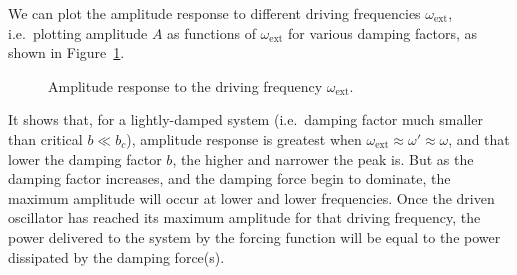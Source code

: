 We can plot the amplitude response to different driving frequencies
$\omega_\text{ext}$, i.e.\ plotting amplitude $A$ as functions of
$\omega_\text{ext}$ for various damping factors, as shown in
Figure~\ref{fig:amp-response}.
\begin{figure}[ht]
  \centering
  \caption{Amplitude response to the driving frequency $\omega_\text{ext}$.}
  \label{fig:amp-response}
\end{figure}
It shows that, for a lightly-damped system (i.e.\ damping factor much smaller
than critical $b\ll b_c$), amplitude response is greatest when
$\omega_\text{ext}\approx\omega'\approx\omega$, and that lower the damping
factor $b$, the higher and narrower the peak is. But as the damping factor
increases, and the damping force begin to dominate, the maximum amplitude will
occur at lower and lower frequencies. Once the driven oscillator has reached
its maximum amplitude for that driving frequency, the power delivered to the
system by the forcing function will be equal to the power dissipated by the
damping force(s).

